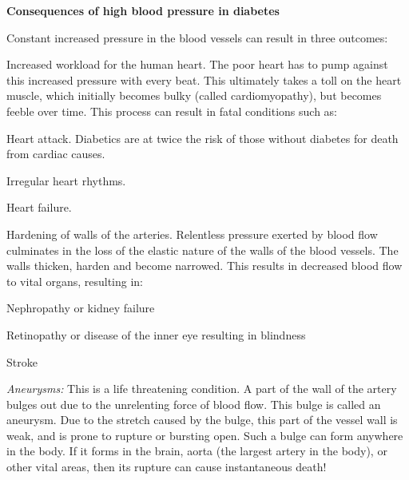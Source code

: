 {

\textbf{Consequences of high blood pressure in diabetes}

Constant increased pressure in the blood vessels can result in three outcomes:

\item Increased workload for the human heart. The poor heart has to pump against this increased pressure with every beat. This ultimately takes a toll on the heart muscle, which initially becomes bulky (called cardiomyopathy), but becomes feeble over time. This process can result in fatal conditions such as:
 \item Heart attack. Diabetics are at twice the risk of those without diabetes for death from cardiac causes.

 \item Irregular heart rhythms.

 \item Heart failure.


 \item Hardening of walls of the arteries. Relentless pressure exerted by blood flow culminates in the loss of the elastic nature of the walls of the blood vessels. The walls thicken, harden and become narrowed. This results in decreased blood flow to vital organs, resulting in:
 \item Nephropathy or kidney failure

 \item Retinopathy or disease of the inner eye resulting in blindness

 \item Stroke


 \item \textit{Aneurysms:} This is a life threatening condition. A part of the wall of the artery bulges out due to the unrelenting force of blood flow. This bulge is called an aneurysm. Due to the stretch caused by the bulge, this part of the vessel wall is weak, and is prone to rupture or bursting open. Such a bulge can form anywhere in the body. If it forms in the brain, aorta (the largest artery in the body), or other vital areas, then its rupture can cause instantaneous death!


}
